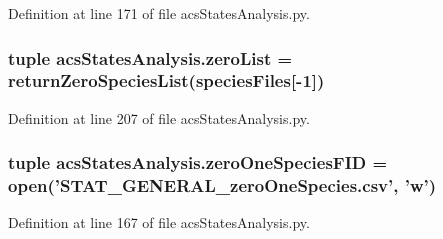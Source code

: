 Definition at line 171 of file acs\-States\-Analysis.\-py.

\hypertarget{a00104_ac2f9e6ead14745bd749a1ab8060cd4e7}{
\subsubsection[{zero\-List}]{\setlength{\rightskip}{0pt plus 5cm}tuple acs\-States\-Analysis.\-zero\-List = {\bf return\-Zero\-Species\-List}({\bf species\-Files}\mbox{[}-\/1\mbox{]})}}\label{a00104_ac2f9e6ead14745bd749a1ab8060cd4e7}


Definition at line 207 of file acs\-States\-Analysis.\-py.

\hypertarget{a00104_a3dc90aca8a97c5995b013887c98d8ce9}{
\subsubsection[{zero\-One\-Species\-F\-I\-D}]{\setlength{\rightskip}{0pt plus 5cm}tuple acs\-States\-Analysis.\-zero\-One\-Species\-F\-I\-D = open('S\-T\-A\-T\-\_\-\-G\-E\-N\-E\-R\-A\-L\-\_\-zero\-One\-Species.\-csv', 'w')}}\label{a00104_a3dc90aca8a97c5995b013887c98d8ce9}


Definition at line 167 of file acs\-States\-Analysis.\-py.


